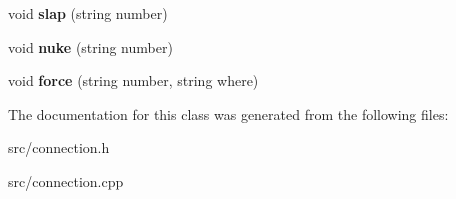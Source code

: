 \begin{DoxyCompactItemize}
\item 
\hypertarget{class_connection_a5d2e18e055436b9203abebab27505953}{
void {\bfseries slap} (string number)}
\label{class_connection_a5d2e18e055436b9203abebab27505953}

\item 
\hypertarget{class_connection_a1c6002e740b53ce3e9b8fad6c9ff9524}{
void {\bfseries nuke} (string number)}
\label{class_connection_a1c6002e740b53ce3e9b8fad6c9ff9524}

\item 
\hypertarget{class_connection_acab5e9cc1c70190edce08fa38b10686e}{
void {\bfseries force} (string number, string where)}
\label{class_connection_acab5e9cc1c70190edce08fa38b10686e}

\end{DoxyCompactItemize}


The documentation for this class was generated from the following files:\begin{DoxyCompactItemize}
\item 
src/connection.h\item 
src/connection.cpp\end{DoxyCompactItemize}
